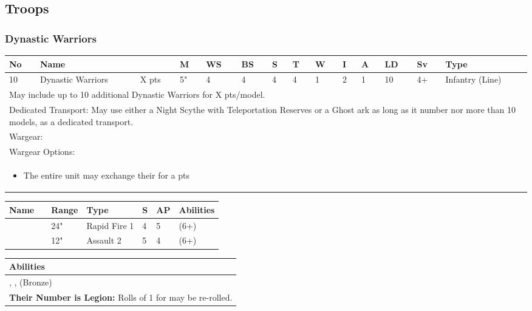 \subsection{Troops}

\subsubsection{Dynastic Warriors}

\noindent
\begin{tabular}{||m{10pt} m{95pt} m{30pt} m{11pt} m{11pt} m{11pt} m{11pt} m{11pt} m{11pt} m{11pt} m{11pt} m{11pt} m{11pt} m{125pt}||}
	\hline
	No & Name & & M & WS & BS & S & T & W & I & A & LD & Sv & Type \\
	\hline
	10 & Dynastic Warriors & X pts & 5" & 4 & 4 & 4 & 4 & 1 & 2 & 1 & 10 & 4+ & Infantry (Line)\\
	\hline
	\hline
	\multicolumn{14}{||Z{532 pt}||}{May include up to 10 additional Dynastic Warriors for X pts/model.}\\	
	\multicolumn{14}{||Z{532 pt}||}{Dedicated Transport: May use either a Night Scythe with Teleportation Reserves or a Ghost ark as long as it number nor more than 10 models, as a dedicated transport.}\\	
	\hline
	\hline
	\multicolumn{14}{||Z{532 pt}||}{Wargear: \quickref{Gauss Flayer}}\\
	\multicolumn{14}{||Z{532 pt}||}{Wargear Options:} \\	\multicolumn{14}{||Z{532 pt}||}{\begin{itemize}
			\item The entire unit may exchange their \quickref{Gauss Flayer} for a \quickref{Gauss Reaper} \hrulefill 0 pts
	\end{itemize}} \\
	\hline
\end{tabular}

\noindent
\begin{tabular}{||m{110pt} m{30pt} m{31pt} m{55pt} m{12pt} m{12pt} m{210pt}||}
	\hline
	Name & & Range & Type & S & AP & Abilities \\
	\hline
	\quickref{Gauss Flayer} & & 24" & Rapid Fire 1 & 4 & 5 & \quickref{Gauss} (6+) \\
	\quickref{Gauss Reaper} & & 12" & Assault 2 & 5 & 4 & \quickref{Gauss} (6+) \\
	\hline
\end{tabular}

\noindent
\begin{tabular}{||m{532pt}||}
	\hline
	Abilities \\
	\hline
	\quickref{Living Metal}, \quickref{Reanimation Protocols}, \quickref{Soulless Hordes} (Bronze) \\
	\textbf{Their Number is Legion:} Rolls of 1 for \quickref{Reanimation Protocols} may be re-rolled. \\
	\hline
\end{tabular}


